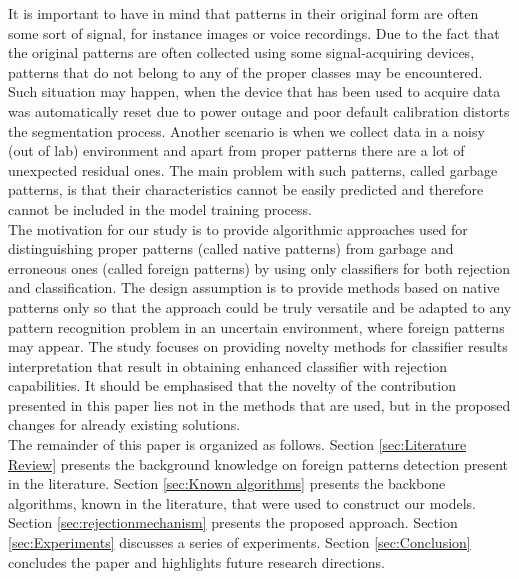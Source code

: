 \documentclass{llncs}
\begin{document}
It is important to have in mind that patterns in their original form are often some sort of signal, for instance images or voice recordings. Due to the fact that the original patterns are often collected using some signal-acquiring devices, patterns that do not belong to any of the proper classes may be encountered. Such situation may happen, when the device that has been used to acquire data was automatically reset due to power outage and poor default calibration distorts the segmentation process. Another scenario is when we collect data in a noisy (out of lab) environment and apart from proper patterns there are a lot of unexpected residual ones. The main problem with such patterns, called garbage patterns, is that their characteristics cannot be easily predicted and therefore cannot be included in the model training process. \\

The motivation for our study is to provide algorithmic approaches used for distinguishing proper patterns (called native patterns) from garbage and erroneous ones (called foreign patterns) by using only classifiers for both rejection and classification. The design assumption is to provide methods based on native patterns only so that the approach could be truly versatile and be adapted to any pattern recognition problem in an uncertain environment, where foreign patterns may appear. The study focuses on providing novelty methods for classifier results interpretation that result in obtaining enhanced classifier with rejection capabilities. It should be emphasised that the novelty of the contribution presented in this paper lies not in the methods that are used, but in the proposed changes for already existing solutions. \\

The remainder of this paper is organized as follows. Section \ref{sec:Literature Review} presents the background knowledge on foreign patterns detection present in the literature. Section \ref{sec:Known algorithms} presents the backbone algorithms, known in the literature, that were used to construct our models. Section \ref{sec:rejectionmechanism} presents the proposed approach. Section 
\ref{sec:Experiments} discusses a series of experiments. Section \ref{sec:Conclusion} concludes the paper and highlights future research directions.

\end{document}
